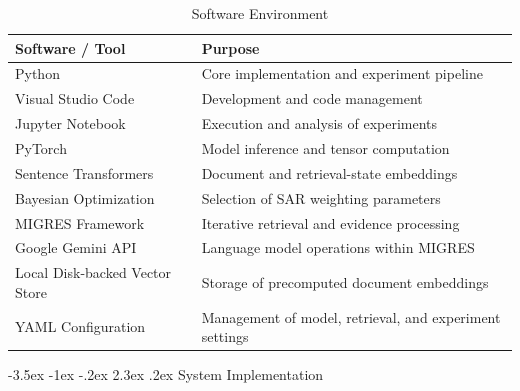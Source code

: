 \documentclass[12pt,a4paper]{report}
\makeatletter
\renewcommand\section{\@startsection{section}{1}{\z@}%
    {-3.5ex \@plus -1ex \@minus -.2ex}%
    {2.3ex \@plus.2ex}%
    {\normalfont\fontsize{16}{19}\selectfont\bfseries}}
\makeatother
\begin{document}
\begin{table}[H]
\centering
\caption{Software Environment}
\label{tab:software-environment}
\renewcommand{\arraystretch}{1.15}
\begin{tabular}{|p{2.35in}|p{3.65in}|}
\hline
\textbf{Software / Tool} & \textbf{Purpose} \\
\hline
Python & Core implementation and experiment pipeline \\
\hline
Visual Studio Code & Development and code management \\
\hline
Jupyter Notebook & Execution and analysis of experiments \\
\hline
PyTorch & Model inference and tensor computation \\
\hline
Sentence Transformers & Document and retrieval-state embeddings \\
\hline
Bayesian Optimization & Selection of SAR weighting parameters \\
\hline
MIGRES Framework & Iterative retrieval and evidence processing \\
\hline
Google Gemini API & Language model operations within MIGRES \\
\hline
Local Disk-backed Vector Store & Storage of precomputed document embeddings \\
\hline
YAML Configuration & Management of model, retrieval, and experiment settings \\
\hline
\end{tabular}
\end{table}

\section{System Implementation}
\end{document}
